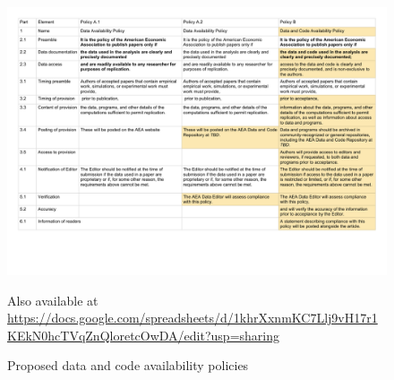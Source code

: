 \documentclass[PP]{AEA}
\begin{document}
\begin{figure}
	\includegraphics[width=\textwidth]{images/AEA_Data_and_Code_Availability_Policies_-_Policies.pdf}
	\caption{Proposed data and code availability policies\label{fig:policies}}
	
	\begin{figurenotes}
		 Also available at \url{https://docs.google.com/spreadsheets/d/1khrXxnmKC7Llj9vH17r1KEkN0hcTVqZnQloretcOwDA/edit?usp=sharing}
		\end{figurenotes}
\end{figure}
\end{document}
